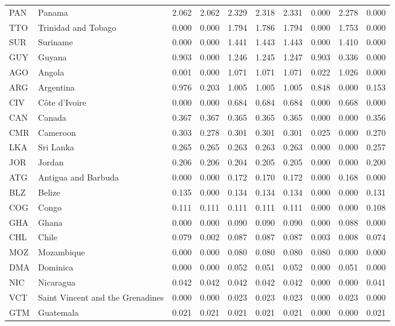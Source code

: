 \begin{table}[ht]
\begin{tabular}{llrrrrrrrr}
  PAN & Panama & 2.062 & 2.062 & 2.329 & 2.318 & 2.331 & 0.000 & 2.278 & 0.000 \\ 
  TTO & Trinidad and Tobago & 0.000 & 0.000 & 1.794 & 1.786 & 1.794 & 0.000 & 1.753 & 0.000 \\ 
  SUR & Suriname & 0.000 & 0.000 & 1.441 & 1.443 & 1.443 & 0.000 & 1.410 & 0.000 \\ 
  GUY & Guyana & 0.903 & 0.000 & 1.246 & 1.245 & 1.247 & 0.903 & 0.336 & 0.000 \\ 
  AGO & Angola & 0.001 & 0.000 & 1.071 & 1.071 & 1.071 & 0.022 & 1.026 & 0.000 \\ 
  ARG & Argentina & 0.976 & 0.203 & 1.005 & 1.005 & 1.005 & 0.848 & 0.000 & 0.153 \\ 
  CIV & Côte d'Ivoire & 0.000 & 0.000 & 0.684 & 0.684 & 0.684 & 0.000 & 0.668 & 0.000 \\ 
  CAN & Canada & 0.367 & 0.367 & 0.365 & 0.365 & 0.365 & 0.000 & 0.000 & 0.356 \\ 
  CMR & Cameroon & 0.303 & 0.278 & 0.301 & 0.301 & 0.301 & 0.025 & 0.000 & 0.270 \\ 
  LKA & Sri Lanka & 0.265 & 0.265 & 0.263 & 0.263 & 0.263 & 0.000 & 0.000 & 0.257 \\ 
  JOR & Jordan & 0.206 & 0.206 & 0.204 & 0.205 & 0.205 & 0.000 & 0.000 & 0.200 \\ 
  ATG & Antigua and Barbuda & 0.000 & 0.000 & 0.172 & 0.170 & 0.172 & 0.000 & 0.168 & 0.000 \\ 
  BLZ & Belize & 0.135 & 0.000 & 0.134 & 0.134 & 0.134 & 0.000 & 0.000 & 0.131 \\ 
  COG & Congo & 0.111 & 0.111 & 0.111 & 0.111 & 0.111 & 0.000 & 0.000 & 0.108 \\ 
  GHA & Ghana & 0.000 & 0.000 & 0.090 & 0.090 & 0.090 & 0.000 & 0.088 & 0.000 \\ 
  CHL & Chile & 0.079 & 0.002 & 0.087 & 0.087 & 0.087 & 0.003 & 0.008 & 0.074 \\ 
  MOZ & Mozambique & 0.000 & 0.000 & 0.080 & 0.080 & 0.080 & 0.080 & 0.000 & 0.000 \\ 
  DMA & Dominica & 0.000 & 0.000 & 0.052 & 0.051 & 0.052 & 0.000 & 0.051 & 0.000 \\ 
  NIC & Nicaragua & 0.042 & 0.042 & 0.042 & 0.042 & 0.042 & 0.000 & 0.000 & 0.041 \\ 
  VCT & Saint Vincent and the Grenadines & 0.000 & 0.000 & 0.023 & 0.023 & 0.023 & 0.000 & 0.023 & 0.000 \\ 
  GTM & Guatemala & 0.021 & 0.021 & 0.021 & 0.021 & 0.021 & 0.000 & 0.000 & 0.021 \\ 

\end{tabular}
\end{table}
